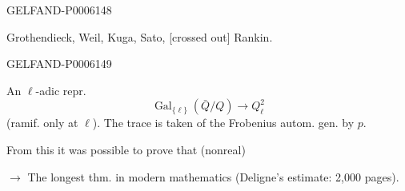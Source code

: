\begin{GelfandAdjacentEvidence}{GELFAND-P000614}{8}

Grothendieck, Weil, Kuga, Sato, [crossed out] Rankin.
\end{GelfandAdjacentEvidence}
\begin{GelfandAdjacentEvidence}{GELFAND-P000614}{9}

An \(\ell\)-adic repr.
\[
\operatorname{Gal}_{\{\ell\}}(\bar Q/Q)\longrightarrow Q_\ell^2
\]
(ramif. only at \(\ell\)).
The trace is taken of the Frobenius autom. gen. by \(p\).

From this it was possible to prove that  (nonreal)
\end{GelfandAdjacentEvidence}

\(\longrightarrow\) The longest thm. in modern mathematics (Deligne’s estimate: 2,000 pages).


